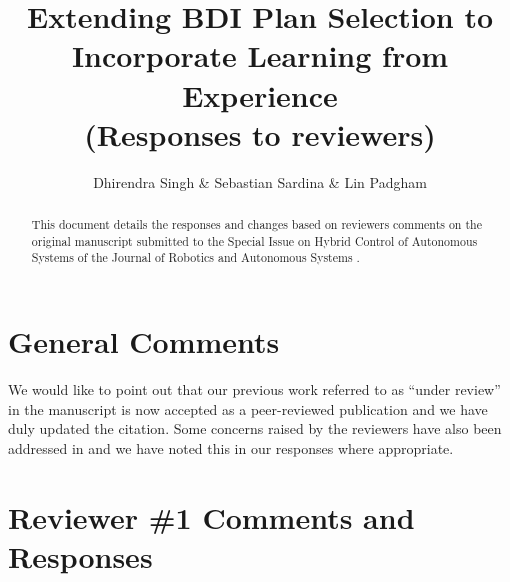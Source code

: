 \documentclass[preprint,12pt]{elsarticle}
\begin{document}
\begin{frontmatter}

\title{Extending BDI Plan Selection to Incorporate Learning from Experience\\
(Responses to reviewers)}

\author{Dhirendra Singh \& Sebastian Sardina \& Lin Padgham}
\address{RMIT University, Melbourne, Australia}

\begin{abstract}
This document details the responses and changes based on reviewers comments on
the original manuscript submitted to the Special Issue on Hybrid Control of
Autonomous Systems of the Journal of Robotics and Autonomous Systems
\cite{Singh:HYCAS10}.
\end{abstract}

\end{frontmatter}


\section*{General Comments}

We would like to point out that our previous work referred to as ``under review''
in the manuscript  is now accepted as a peer-reviewed publication
\cite{Singh:AAMAS10} and we have duly updated the citation. Some concerns raised
by the reviewers have also been addressed in \cite{Singh:AAMAS10} and we have
noted this in our responses where appropriate.

\section{Reviewer \#1 Comments and Responses}

\end{document}

